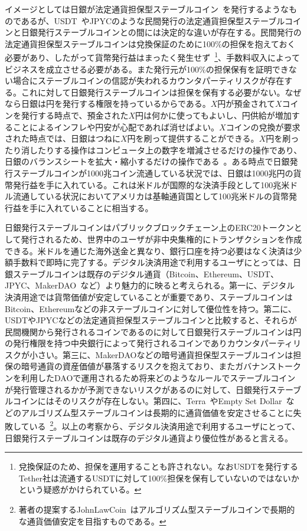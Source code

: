 \documentclass[dvipdfmx,a4paper]{jsarticle}
\begin{document}
イメージとしては日銀が法定通貨担保型ステーブルコイン~\cite{arner2020stablecoins,moin2020sok}を発行するようなものであるが、USDT~\cite{tether}やJPYCのような民間発行の法定通貨担保型ステーブルコインと日銀発行ステーブルコインとの間には決定的な違いが存在する。民間発行の法定通貨担保型ステーブルコインは兌換保証のために100\%の担保を抱えておく必要があり、したがって貨幣発行益はまったく発生せず~\footnote{兌換保証のため、担保を運用することも許されない。なおUSDTを発行するTether社は流通するUSDTに対して100\%担保を保有していないのではないかという疑惑がかけられている。}、手数料収入によってビジネスを成立させる必要がある。また発行元が100\%の担保保有を証明できない場合にステーブルコインの信認が失われるカウンタパーティリスクが存在する。これに対して日銀発行ステーブルコインは担保を保有する必要がない。なぜなら日銀は円を発行する権限を持っているからである。$X$円が預金されて$X$コインを発行する時点で、預金された$X$円は何かに使ってもよいし、円供給が増加することによるインフレや円安が心配であれば消せばよい。$X$コインの兌換が要求された時点では、日銀はつねに$X$円を刷って提供することができる。$X$円を刷ったり消したりする操作はコンピュータ上の数字を増減させるだけの操作であり、日銀のバランスシートを拡大・縮小するだけの操作である~\cite{mmt2016wray}。ある時点で日銀発行ステーブルコインが1000兆コイン流通している状況では、日銀は1000兆円の貨幣発行益を手に入れている。これは米ドルが国際的な決済手段として100兆米ドル流通している状況においてアメリカは基軸通貨国として100兆米ドルの貨幣発行益を手に入れていることに相当する。

日銀発行ステーブルコインはパブリックブロックチェーン上のERC20トークンとして発行されるため、世界中のユーザが非中央集権的にトランザクションを作成できる。米ドルを通じた海外送金と異なり、銀行口座を持つ必要はなく決済は少額手数料で即時に完了する。デジタル決済用途で利用するユーザにとっては、日銀ステーブルコインは既存のデジタル通貨（Bitcoin、Ethereum、USDT、JPYC、MakerDAO~\cite{makerdao}など）より魅力的に映ると考えられる。第一に、デジタル決済用途では貨幣価値が安定していることが重要であり、ステーブルコインはBitcoin、Ethereumなどの非ステーブルコインに対して優位性を持つ。第二に、USDTやJPYCなどの法定通貨担保型ステーブルコインと比較すると、それらが民間機関から発行されるコインであるのに対して日銀発行ステーブルコインは円の発行権限を持つ中央銀行によって発行されるコインでありカウンタパーティリスクが小さい。第三に、MakerDAOなどの暗号通貨担保型ステーブルコインは担保の暗号通貨の資産価値が暴落するリスクを抱えており、またガバナンストークンを利用したDAOで運用されるため将来どのようなルールでステーブルコインが発行管理されるかが予測できないリスクがあるのに対して、日銀発行ステーブルコインにはそのリスクが存在しない。第四に、Terra~\cite{terra}やEmpty Set Dollar~\cite{emptysetdollar}などのアルゴリズム型ステーブルコインは長期的に通貨価値を安定させることに失敗している~\footnote{著者の提案するJohnLawCoin~\cite{johnlawcoin}はアルゴリズム型ステーブルコインで長期的な通貨価値安定を目指すものである。}。以上の考察から、デジタル決済用途で利用するユーザにとって、日銀発行ステーブルコインは既存のデジタル通貨より優位性があると言える。
\end{document}
